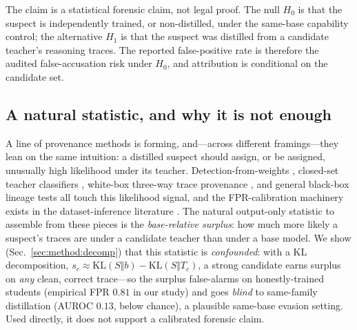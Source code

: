 \documentclass[journal]{IEEEtran}
\begin{document}
The claim is a statistical forensic claim, not legal proof. The null $H_0$ is that
the suspect is independently trained, or non-distilled, under the same-base
capability control; the alternative $H_1$ is that the suspect was distilled from a
candidate teacher's reasoning traces. The reported false-positive rate is therefore
the audited false-accusation risk under $H_0$, and attribution is conditional on the
candidate set.

\subsection{A natural statistic, and why it is not enough}
A line of provenance methods is forming, and---across different
framings---they lean on the same intuition: a distilled suspect should assign, or be
assigned, unusually high likelihood under its teacher. Detection-from-weights
\cite{shi2025distillationdetection}, closed-set teacher classifiers
\cite{wadhwa2025whotaught}, white-box three-way trace provenance
\cite{liu2025wheredid}, and general black-box lineage tests
\cite{nikolic2025modelprovenance, qiu2026provenanceset} all touch this
likelihood signal, and the FPR-calibration machinery exists in the dataset-inference
literature \cite{maini2021datasetinference, maini2024llmdatasetinference, oren2024testsetcontamination, zhao2025posthocdatasetinference, dziedzic2022selfsupervised}.
The natural output-only statistic to assemble from these pieces is the
\emph{base-relative surplus}: how much more likely a suspect's traces are under a
candidate teacher than under a base model. We show (Sec.~\ref{sec:method:decomp})
that this statistic is \emph{confounded}: with a KL decomposition,
$s_c\!\approx\!\mathrm{KL}(S\Vert b)-\mathrm{KL}(S\Vert T_c)$, a strong candidate
earns surplus on \emph{any} clean, correct trace---so the surplus false-alarms on
honestly-trained students (empirical FPR $0.81$ in our study) and goes \emph{blind}
to same-family distillation (AUROC $0.13$, below chance), a plausible same-base
evasion setting. Used directly, it does not support a calibrated forensic
claim.
\end{document}
